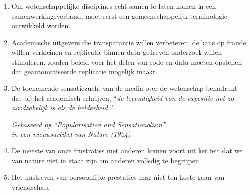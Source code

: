 \documentclass[a5paper]{article}
\begin{document}
\begin{enumerate}
\item Om wetenschappelijke disciplines echt samen te laten komen in een samenwerkingsverband, moet eerst een gemeenschappelijk \mbox{terminologie} ontwikkeld worden.

\item Academische uitgevers die transparantie willen verbeteren, de kans op fraude willen verkleinen en replicatie binnen data-gedreven \mbox{onderzoek} willen stimuleren, zouden beleid voor het delen van code en data moeten opstellen dat geautomatiseerde replicatie mogelijk maakt.

\item De toenemende sensatiezucht van de media over de wetenschap \mbox{benadrukt} dat bij het academisch schrijven, ``\textit{de levendigheid van de \mbox{expositie} net zo noodzakelijk is als de helderheid.}''
\begin{flushright}
  \vspace{-1.75mm}
  \textit{Gebaseerd op ``Popularisation and Sensationalism''\\ in een nieuwsartikel van Nature (1924)}
  \vspace{-1mm}
  \end{flushright}  

\item De meeste van onze frustraties met anderen komen voort uit het feit dat we van nature niet in staat zijn om anderen volledig te begrijpen.


\item Het nastreven van persoonlijke prestaties mag niet ten koste gaan van vriendschap.

\end{enumerate}
\end{document}
